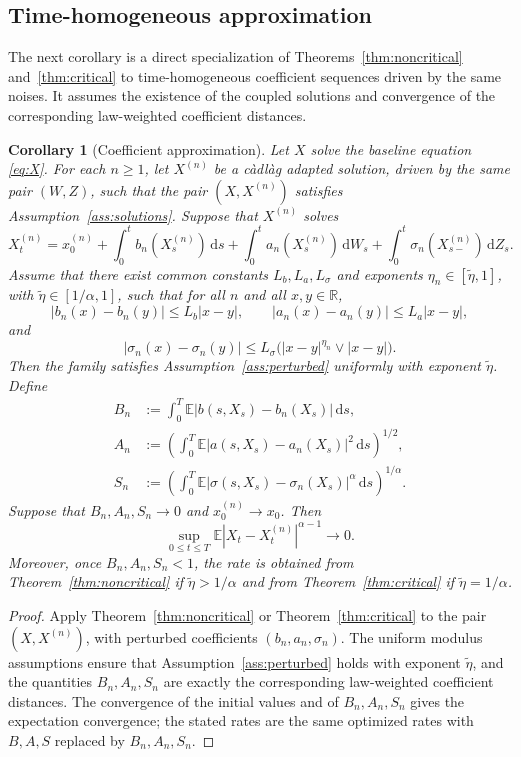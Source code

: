 \documentclass[10pt,a4paper]{amsart}
\newtheorem{corollary}[theorem]{Corollary}
\newcommand{\R}{\mathbb{R}}
\newcommand{\E}{\mathbb{E}}
\newcommand{\1}{\mathbf{1}}
\newcommand{\dd}{\,\mathrm{d}}
\newcommand{\wt}{\tilde}
\begin{document}
\subsection{Time-homogeneous approximation}
\label{sec:approximation}

The next corollary is a direct specialization of Theorems~\ref{thm:noncritical} and~\ref{thm:critical} to time-homogeneous coefficient sequences driven by the same noises. It assumes the existence of the coupled solutions and convergence of the corresponding law-weighted coefficient distances.


\begin{corollary}[Coefficient approximation]
\label{cor:approx}
Let $X$ solve the baseline equation \eqref{eq:X}. For each $n\ge1$, let $X^{(n)}$ be a c\`adl\`ag adapted solution, driven by the same pair $(W,Z)$, such that the pair $(X,X^{(n)})$ satisfies Assumption~\ref{ass:solutions}. Suppose that $X^{(n)}$ solves
\[
X_t^{(n)}=x_0^{(n)}+\int_0^t b_n(X_s^{(n)})\dd s
+\int_0^t a_n(X_s^{(n)})\dd W_s
+\int_0^t \sigma_n(X_{s-}^{(n)})\dd Z_s.
\]
Assume that there exist common constants $L_b,L_a,L_\sigma$ and exponents $\eta_n\in[\wt\eta,1]$, with $\wt\eta\in[1/\alpha,1]$, such that for all $n$ and all $x,y\in\R$,
\[
|b_n(x)-b_n(y)|\le L_b|x-y|,
\qquad
|a_n(x)-a_n(y)|\le L_a|x-y|,
\]
and
\[
|\sigma_n(x)-\sigma_n(y)|\le L_\sigma\bigl(|x-y|^{\eta_n}\vee |x-y|\bigr).
\]
Then the family satisfies Assumption~\ref{ass:perturbed} uniformly with exponent $\wt\eta$. Define
\begin{align*}
B_n&:=\int_0^T\E |b(s,X_s)-b_n(X_s)|\dd s,\\
A_n&:=\left(\int_0^T\E |a(s,X_s)-a_n(X_s)|^2\dd s\right)^{1/2},\\
S_n&:=\left(\int_0^T\E |\sigma(s,X_s)-\sigma_n(X_s)|^\alpha\dd s\right)^{1/\alpha}.
\end{align*}
Suppose that $B_n,A_n,S_n\to0$ and $x_0^{(n)}\to x_0$. Then
\[
\sup_{0\le t\le T}\E|X_t-X_t^{(n)}|^{\alpha-1}\to0.
\]
Moreover, once $B_n,A_n,S_n<1$, the rate is obtained from Theorem~\ref{thm:noncritical} if $\wt\eta>1/\alpha$ and from Theorem~\ref{thm:critical} if $\wt\eta=1/\alpha$.
\end{corollary}

\begin{proof}
Apply Theorem~\ref{thm:noncritical} or Theorem~\ref{thm:critical} to the pair $(X,X^{(n)})$, with perturbed coefficients $(b_n,a_n,\sigma_n)$. The uniform modulus assumptions ensure that Assumption~\ref{ass:perturbed} holds with exponent $\wt\eta$, and the quantities $B_n,A_n,S_n$ are exactly the corresponding law-weighted coefficient distances. The convergence of the initial values and of $B_n,A_n,S_n$ gives the expectation convergence; the stated rates are the same optimized rates with $B,A,S$ replaced by $B_n,A_n,S_n$.
\end{proof}
\end{document}
